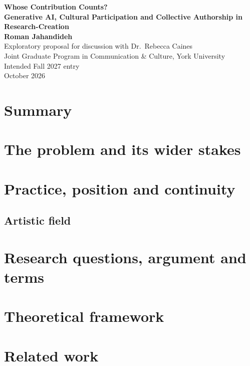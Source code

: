 \documentclass[letterpaper,11pt]{article}
\begin{document}
\begin{center}
  {\bf\Large Whose Contribution Counts?}\\[4pt]
  {\bf\large Generative AI, Cultural Participation and Collective Authorship in Research-Creation}\\[12pt]
  {\bf Roman Jahandideh}\\[3pt]
  Exploratory proposal for discussion with Dr.\ Rebecca Caines\\
  Joint Graduate Program in Communication \& Culture, York University\\
  Intended Fall 2027 entry\\[3pt]
  October 2026
\end{center}

\section*{Summary}


\section{The problem and its wider stakes}


\section{Practice, position and continuity}\label{sec:practice}


\subsection*{Artistic field}


\section{Research questions, argument and terms}


\section{Theoretical framework}


\section{Related work}

\end{document}
